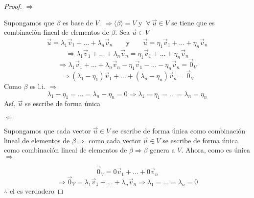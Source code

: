 \begin{proof} 
    $\Rightarrow$ 
    
    Supongamos que $\beta$ es base de $V$. $\Rightarrow \langle \beta \rangle = V $ y $ \: \forall \: \vec{u} \in V$ se tiene que es combinación lineal de elementos de $\beta$. Sea $\vec{u} \in V$
    \begin{align*}
        \vec{u} = {\lambda}_{1}{\vec{v}}_{1} + ... + {\lambda}_{n}{\vec{v}}_{n} && \text{ y } && \vec{u} = {\eta}_{1}{\vec{v}}_{1} + ... + {\eta}_{n}{\vec{v}}_{n}
    \end{align*}
    \begin{equation*}
        \Rightarrow {\lambda}_{1}{\vec{v}}_{1} + ... + {\lambda}_{n}{\vec{v}}_{n} = {\eta}_{1}{\vec{v}}_{1} + ... + {\eta}_{n}{\vec{v}}_{n}
    \end{equation*}
    \begin{equation*}
        \Rightarrow {\lambda}_{1}{\vec{v}}_{1} + ... + {\lambda}_{n}{\vec{v}}_{n} - {\eta}_{1}{\vec{v}}_{1} - ... - {\eta}_{n}{\vec{v}}_{n} = {\vec{0}}_{V}
    \end{equation*}
    \begin{equation*}
        \Rightarrow ({\lambda}_{1} - {\eta}_{1}){\vec{v}}_{1} + ... + ({\lambda}_{n} - {\eta}_{n}){\vec{v}}_{n} = {\vec{0}}_{V}
    \end{equation*}
    Como $\beta$ es l.i. $\Rightarrow$
    \begin{equation*}
        {\lambda}_{1} - {\eta}_{1} = ... = {\lambda}_{n} - {\eta}_{n} = 0 \Rightarrow {\lambda}_{1} = {\eta}_{1} = ... = {\lambda}_{n} = {\eta}_{n}
    \end{equation*}
    Así, $\vec{u}$ se escribe de forma única 


    $\Leftarrow$ 
    
    Supongamos que cada vector $\vec{u} \in V$ se escribe de forma única como combinación lineal de elementos de $\beta \Rightarrow$ como cada vector $\vec{u} \in V$ se escribe de forma única como combinación lineal de elementos de $\beta \Rightarrow \beta$ genera a $V$. Ahora, como es única $\Rightarrow$

    \begin{equation*}
        {\vec{0}}_{V} = 0{\vec{v}}_{1} + ... + 0{\vec{v}}_{n}
    \end{equation*}
    \begin{equation*}
        \Rightarrow  {\vec{0}}_{V} = {\lambda}_{1}{\vec{v}}_{1} + ... + {\lambda}_{n}{\vec{v}}_{n} \Rightarrow {\lambda}_{1} = ... = {\lambda}_{n} = 0
    \end{equation*}
    $\therefore$ el  es verdadero
\end{proof}

